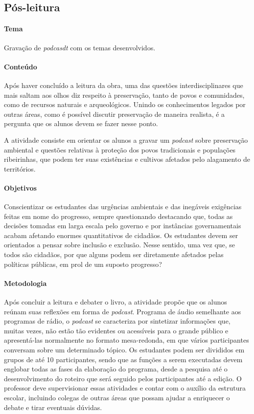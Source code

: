 \documentclass[12pt]{extarticle}
\begin{document}
\subsection{Pós-leitura}

\paragraph{Tema} Gravação de \emph{podcasdt} com os temas desenvolvidos.  

\paragraph{Conteúdo}
Após haver concluído a leitura da obra, uma das questões
interdisciplinares que mais saltam aos olhos diz respeito à
preservação, tanto de povos e comunidades, como de recursos naturais e
arqueológicos. Unindo os conhecimentos legados por outras áreas, como
é possível discutir preservação de maneira realista, é a pergunta que
os alunos devem se fazer nesse ponto.

  A atividade consiste em orientar os alunos a gravar um \emph{podcast}
  sobre preservação ambiental e questões relativas à proteção dos povos
  tradicionais e populações ribeirinhas, que podem ter suas existências
  e cultivos afetados pelo alagamento de territórios.

\paragraph{Objetivos}
  Conscientizar os estudantes das urgências ambientais e das inegáveis
  exigências feitas em nome do progresso, sempre questionando destacando
  que, todas as decisões tomadas em larga escala pelo governo e por
  instâncias governamentais acabam afetando enormes quantitativos de
  cidadãos. Os estudantes devem ser orientados a pensar sobre inclusão e
  exclusão. Nesse sentido, uma vez que, se todos são cidadãos, por que
  alguns podem ser diretamente afetados pelas políticas públicas, em
  prol de um suposto progresso?

\paragraph{Metodologia}
  Após concluir a leitura e debater o livro, a atividade propõe que os
  alunos reúnam suas reflexões em forma de \emph{podcast}. Programa de
  áudio semelhante aos programas de rádio, o \emph{podcast} se
  caracteriza por sintetizar informações que, muitas vezes, não estão
  tão evidentes ou acessíveis para o grande público e apresentá-las
  normalmente no formato mesa-redonda, em que vários participantes
  conversam sobre um determinado tópico. Os estudantes podem ser
  divididos em grupos de até 10 participantes, sendo que as funções a
  serem executadas devem englobar todas as fases da elaboração do
  programa, desde a pesquisa até o desenvolvimento do roteiro que será
  seguido pelos participantes até a edição. O professor deve
  supervisionar essas atividades e contar com o auxílio da estrutura
  escolar, incluindo colegas de outras áreas que possam ajudar a
  enriquecer o debate e tirar eventuais dúvidas.
\end{document}
